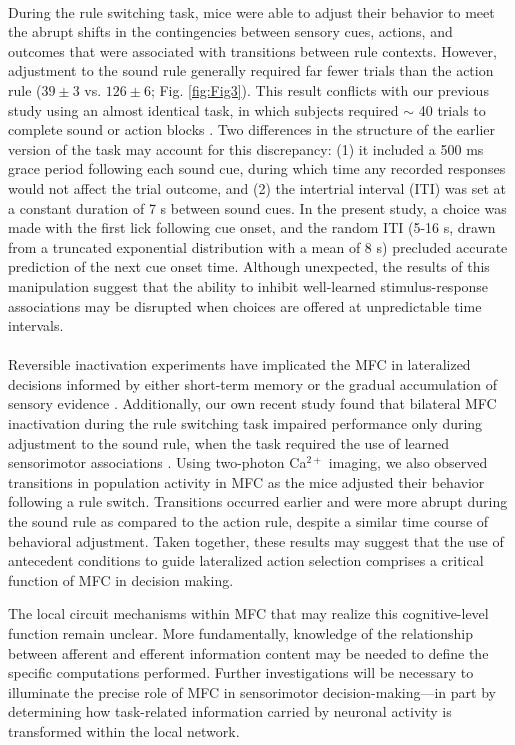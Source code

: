 \paragraph{} During the rule switching task, mice were able to adjust their behavior to meet the abrupt shifts in the contingencies between sensory cues, actions, and outcomes that were associated with transitions between rule contexts.  However, adjustment to the sound rule generally required far fewer trials than the action rule ($39 \pm 3$ vs. $126 \pm 6$; Fig. \ref{fig:Fig3}). This result conflicts with our previous study using an almost identical task, in which subjects required $\sim$ 40 trials to complete sound or action blocks \citep{siniscalchi2016fast}. Two differences in the structure of the earlier version of the task may account for this discrepancy: (1) it included a 500 ms grace period following each sound cue, during which time any recorded responses would not affect the trial outcome, and (2) the intertrial interval (ITI) was set at a constant duration of 7 s between sound cues. In the present study, a choice was made with the first lick following cue onset, and the random ITI (5-16 s, drawn from a truncated exponential distribution with a mean of 8 s) precluded accurate prediction of the next cue onset time. Although unexpected, the results of this manipulation suggest that the ability to inhibit well-learned stimulus-response associations may be disrupted when choices are offered at unpredictable time intervals.    

\paragraph{} Reversible inactivation experiments have implicated the MFC in lateralized decisions informed by either short-term memory \citep{erlich2011cortical,guo2014flow,kopec2015cortical} or the gradual accumulation of sensory evidence \citep{erlich2015distinct,hanks2015distinct}. Additionally, our own recent study found that bilateral MFC inactivation during the rule switching task impaired performance only during adjustment to the sound rule, when the task required the use of learned sensorimotor associations \citep{siniscalchi2016fast}. Using two-photon Ca$^{2+}$ imaging, we also observed transitions in population activity in MFC as the mice adjusted their behavior following a rule switch. Transitions occurred earlier and were more abrupt during the sound rule as compared to the action rule, despite a similar time course of behavioral adjustment. Taken together, these results may suggest that the use of antecedent conditions to guide lateralized action selection comprises a critical function of MFC in decision making.

The local circuit mechanisms within MFC that may realize this cognitive-level function remain unclear. More fundamentally, knowledge of the relationship between afferent and efferent information content may be needed to define the specific computations performed. Further investigations will be necessary to illuminate the precise role of MFC in sensorimotor decision-making---in part by determining how task-related information carried by neuronal activity is transformed within the local network. 
